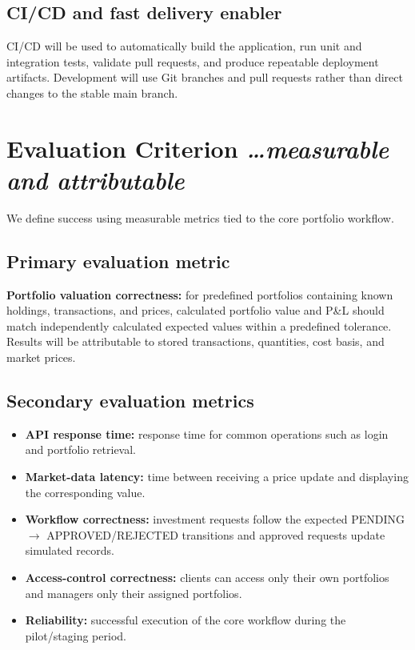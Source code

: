 \documentclass[11pt,a4paper]{article}
\newcommand{\BvrHint}[1]{{\normalfont\normalsize\itshape\hfill #1}}
\begin{document}
\subsection{CI/CD and fast delivery enabler}
CI/CD will be used to automatically build the application, run unit and integration tests, validate pull requests, and produce repeatable deployment artifacts. Development will use Git branches and pull requests rather than direct changes to the stable main branch.

\section{Evaluation Criterion \BvrHint{\ldots measurable and attributable}}
We define success using measurable metrics tied to the core portfolio workflow.

\subsection{Primary evaluation metric}
\textbf{Portfolio valuation correctness:} for predefined portfolios containing known holdings, transactions, and prices, calculated portfolio value and P\&L should match independently calculated expected values within a predefined tolerance. Results will be attributable to stored transactions, quantities, cost basis, and market prices.

\subsection{Secondary evaluation metrics}
\begin{itemize}[leftmargin=0.7cm]
\item \textbf{API response time:} response time for common operations such as login and portfolio retrieval.
\item \textbf{Market-data latency:} time between receiving a price update and displaying the corresponding value.
\item \textbf{Workflow correctness:} investment requests follow the expected PENDING $\rightarrow$ APPROVED/REJECTED transitions and approved requests update simulated records.
\item \textbf{Access-control correctness:} clients can access only their own portfolios and managers only their assigned portfolios.
\item \textbf{Reliability:} successful execution of the core workflow during the pilot/staging period.
\end{itemize}
\end{document}
